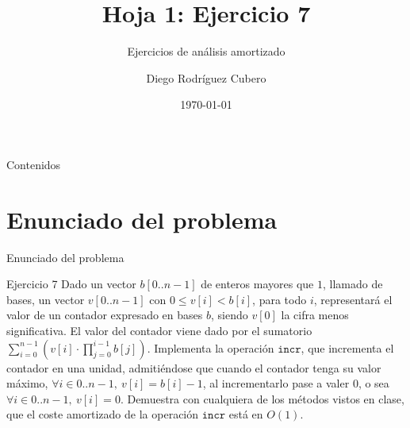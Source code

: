 \documentclass[aspectratio=169]{beamer}
\title{Hoja 1: Ejercicio 7}
\subtitle{Ejercicios de análisis amortizado}
\author{Diego Rodríguez Cubero}
\institute{UCM}
\date{\today}
\begin{document}
\begin{frame}
    \titlepage
\end{frame}

\begin{frame}{Contenidos}
    \tableofcontents
\end{frame}

\section{Enunciado del problema}
\begin{frame}{Enunciado del problema}
    \begin{block}{Ejercicio 7}
        Dado un vector $b[0..n-1]$ de enteros mayores que $1$, llamado de bases, un vector $v[0..n-1]$ con $0 \leq v[i] < b[i]$, para todo $i$, representará el valor de un contador expresado en bases $b$, siendo $v[0]$ la cifra menos significativa. El valor del contador viene dado por el sumatorio $\sum_{i=0}^{n-1} \left(v[i] \cdot \prod_{j=0}^{i-1} b[j]\right)$. Implementa la operación $\texttt{incr}$, que incrementa el contador en una unidad, admitiéndose que cuando el contador tenga su valor máximo, $\forall i \in 0..n-1,\ v[i] = b[i] - 1$, al incrementarlo pase a valer $0$, o sea $\forall i \in 0..n-1,\ v[i] = 0$. Demuestra con cualquiera de los métodos vistos en clase, que el coste amortizado de la operación $\texttt{incr}$ está en $O(1)$.
    \end{block}
\end{frame}

\end{document}
